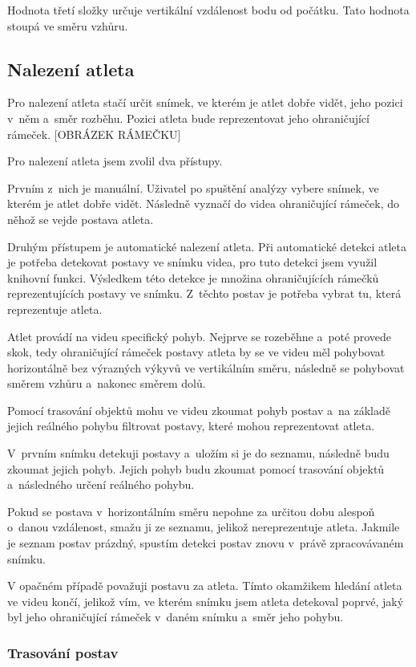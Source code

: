 Hodnota třetí složky určuje vertikální vzdálenost bodu od počátku. Tato hodnota stoupá ve směru vzhůru.

\subsection{Nalezení atleta}

Pro nalezení atleta stačí určit snímek, ve kterém je atlet dobře vidět, jeho pozici v~něm a~směr rozběhu. Pozici atleta bude reprezentovat jeho ohraničující rámeček. [OBRÁZEK RÁMEČKU]

Pro nalezení atleta jsem zvolil dva přístupy.

Prvním z~nich je manuální. Uživatel po spuštění analýzy vybere snímek, ve kterém je atlet dobře vidět. Následně vyznačí do videa ohraničující rámeček, do něhož se vejde postava atleta.

Druhým přístupem je automatické nalezení atleta. Při automatické detekci atleta je potřeba detekovat postavy ve snímku videa, pro tuto detekci jsem využil knihovní funkci. Výsledkem této detekce je množina ohraničujících rámečků reprezentujících postavy ve snímku. Z~těchto postav je potřeba vybrat tu, která reprezentuje atleta.

Atlet provádí na videu specifický pohyb. Nejprve se rozeběhne a~poté provede skok, tedy ohraničující rámeček postavy atleta by se ve videu měl pohybovat horizontálně bez výrazných výkyvů ve vertikálním směru, následně se pohybovat směrem vzhůru a~nakonec směrem dolů.

Pomocí trasování objektů mohu ve videu zkoumat pohyb postav a~na základě jejich reálného pohybu filtrovat postavy, které mohou reprezentovat atleta.

V~prvním snímku detekuji postavy a~uložím si je do seznamu, následně budu zkoumat jejich pohyb. Jejich pohyb budu zkoumat pomocí trasování objektů a~následného určení reálného pohybu.

Pokud se postava v~horizontálním směru nepohne za určitou dobu alespoň o~danou vzdálenost, smažu ji ze seznamu, jelikož nereprezentuje atleta. Jakmile je seznam postav prázdný, spustím detekci postav znovu v~právě zpracovávaném snímku.

V opačném případě považuji postavu za atleta. Tímto okamžikem hledání atleta ve videu končí, jelikož vím, ve kterém snímku jsem atleta detekoval poprvé, jaký byl jeho ohraničující rámeček v~daném snímku a~směr jeho pohybu.

\subsubsection{Trasování postav}


